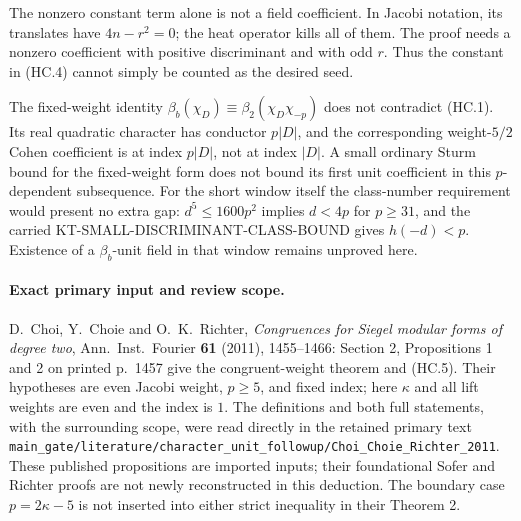 The nonzero constant term alone is not a field coefficient.
In Jacobi notation, its translates have $4n-r^2=0$; the heat
operator kills all of them.  The proof needs a nonzero
coefficient with positive discriminant and with odd $r$.
Thus the constant in (HC.4) cannot simply be counted as the
desired seed.

The fixed-weight identity
$\beta_b(\chi_D)\equiv\beta_2(\chi_D\chi_{-p})$
does not contradict (HC.1).  Its real quadratic character has
conductor $p|D|$, and the corresponding weight-$5/2$ Cohen
coefficient is at index $p|D|$, not at index $|D|$.
A small ordinary Sturm bound for the fixed-weight form
does not bound its first unit coefficient in this
$p$-dependent subsequence.
For the short window itself the class-number requirement
would present no extra gap: $d^5\leq1600p^2$ implies
$d<4p$ for $p\geq31$, and the carried
KT-SMALL-DISCRIMINANT-CLASS-BOUND gives $h(-d)<p$.
Existence of a $\beta_b$-unit field in that window remains
unproved here.

\paragraph{Exact primary input and review scope.}
D.~Choi, Y.~Choie and O.~K.~Richter,
\emph{Congruences for Siegel modular forms of degree two},
Ann.~Inst.~Fourier \textbf{61} (2011), 1455--1466:
Section 2, Propositions 1 and 2 on printed p.~1457 give
the congruent-weight theorem and (HC.5).
Their hypotheses are even Jacobi weight, $p\geq5$, and
fixed index; here $\kappa$ and all lift weights are even
and the index is $1$.  The definitions and both full
statements, with the surrounding scope, were read directly
in the retained primary text
\texttt{main\_gate/literature/character\_unit\_followup/Choi\_Choie\_Richter\_2011}.
These published propositions are imported inputs; their
foundational Sofer and Richter proofs are not newly
reconstructed in this deduction.  The boundary case
$p=2\kappa-5$ is not inserted into either strict inequality
in their Theorem 2.
